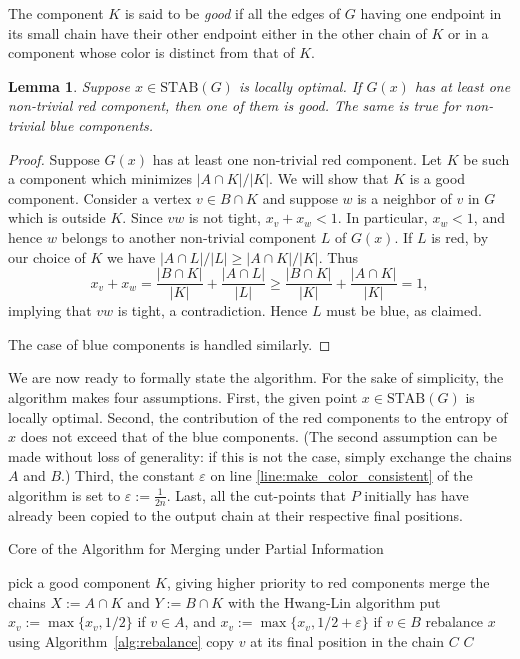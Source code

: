 \documentclass{article} \usepackage{fullpage}
\newtheorem{lemma}{Lemma}
\newcommand{\STAB}{\mathrm{STAB}}
\begin{document}
The component $K$ is said to be {\sl good} if all the edges of $G$ having one endpoint in its small chain have their other endpoint either in the other chain of $K$ or in a component whose color is distinct from that of $K$.

\begin{lemma}
\label{lem:good_component}
Suppose $x \in \STAB(G)$ is locally optimal. If $G(x)$ has at least one non-trivial red component, then one of them is good. The same is true for non-trivial blue components.
\end{lemma}
\begin{proof}
Suppose $G(x)$ has at least one non-trivial red component.
Let $K$ be such a component which minimizes $|A \cap K|/|K|$.
We will show that $K$ is a good component.
Consider a vertex $v\in B \cap K$ and suppose 
$w$ is a neighbor of $v$ in $G$  which is outside $K$.
Since $vw$ is not tight, $x_v + x_w < 1$. In particular, $x_w < 1$, and hence
$w$ belongs to another non-trivial component $L$ of $G(x)$. 
If $L$ is red, by our choice of $K$ we have 
$|A \cap L|/ |L| \geq |A \cap K|/|K|$. Thus
$$
x_v + x_w = \frac{|B \cap K|}{|K|} + \frac{|A \cap L|}{|L|}
\geq \frac{|B \cap K|}{|K|} + \frac{|A \cap K|}{|K|} = 1,
$$
implying that $vw$ is tight, a contradiction. 
Hence $L$ must be blue, as claimed.

The case of blue components is handled similarly.
\end{proof}

We are now ready to formally state the algorithm. For the sake of simplicity, the algorithm makes four assumptions. First, the given point $x \in \STAB(G)$ is locally optimal. Second, the contribution of the red components to the entropy of $x$ does not exceed that of the blue components. (The second assumption can be made without loss of generality: if this is not the case, simply exchange the chains $A$ and $B$.) Third, the constant $\varepsilon$ on line \ref{line:make_color_consistent} of the algorithm is set to $\varepsilon := \frac{1}{2n}$. Last, all the cut-points that $P$ initially has have already been copied to the output chain at their respective final positions.

\begin{algorithm}[h!]
\caption{Core of the Algorithm for Merging under Partial Information} \label{alg:MUPI_core}
\begin{algorithmic}[1]
\STATE \label{line:pick} pick a good component $K$, giving higher priority to red components
\STATE \label{line:HL} merge the chains $X := A \cap K$ and $Y := B \cap K$ with the Hwang-Lin algorithm 
\label{line:begin_for-loop1}
\STATE \label{line:make_color_consistent} put $x_{v} := \max \{x_v,1/2\}$ if $v \in A$, and $x_v := \max \{x_v, 1/2 + \varepsilon\}$ if $v \in B$
\ENDFOR\label{line:end_for-loop1}
\STATE \label{line:rebalance_core} rebalance $x$ using Algorithm~\ref{alg:rebalance}
\label{line:begin_for-loop2}
\STATE copy $v$ at its final position in the chain $C$
\ENDIF
\ENDFOR\label{line:end_for-loop2}
\ENDWHILE
\RETURN $C$
\end{algorithmic}
\end{algorithm}
\end{document}
